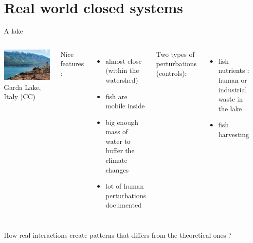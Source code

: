 \documentclass[11,aspectratio=1610]{beamer}
\begin{document}
\section{Real world closed systems}



\begin{frame}{A lake}
\begin{footnotesize}
 \begin{columns}
\includegraphics[width=\textwidth]{img/lake_garda_italy.jpg}
\tiny{Garda Lake, Italy (CC)}
          
Nice features : 
\begin{itemize}
  \item  almost close (within the watershed)
  \item  fish are mobile inside 
  \item  big enough mass of water  to buffer the climate changes
  \item  lot of human perturbations documented 
\end{itemize}

Two types of perturbations (\alert{controls}): 

\begin{itemize}
\item fish nutrients : human or industrial waste in the lake 
\item  fish harvesting 
\end{itemize}
\end{columns}
\end{footnotesize}
\vfill
How real interactions create patterns that differs from the theoretical ones ? 
 
\end{frame}
\end{document}

